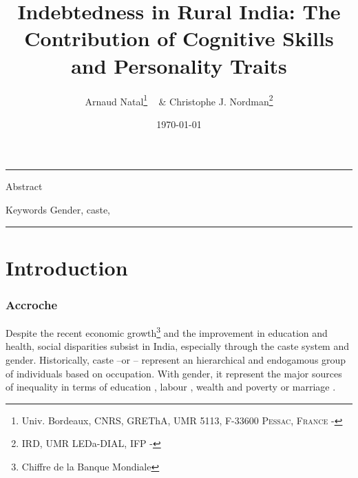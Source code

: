 \documentclass[a4paper, 11pt, onecolumn]{article}
\title{Indebtedness in Rural India: The Contribution of Cognitive Skills and Personality Traits}
\author{Arnaud Natal\thanks{Univ. Bordeaux, CNRS, GREThA, UMR 5113, F-33600 \textsc{Pessac, France} - \email{arnaud.natal@u-bordeaux.fr}} ~ \& Christophe J. Nordman\thanks{IRD, UMR LEDa-DIAL, IFP - \email{nordman@dial.prd}} }
\date{\today}
\begin{document}
\maketitle

\hrule 
\vspace{0.3cm}

\begin{resab}{Abstract}

\end{resab}

\begin{motkey}{Keywords}
Gender, caste, 
\end{motkey}


\hrule

\section{Introduction}
\label{Introduction}
		\subsubsection{Accroche}
Despite the recent economic growth\footnote{Chiffre de la Banque Mondiale} and the improvement in education and health, social disparities subsist in India, especially through the caste system and gender.
Historically, caste --or \jati -- represent an hierarchical and endogamous group of individuals based on occupation.
With gender, it represent the major sources of inequality in terms of education \citep{Munshi2006, Hasan2006, Saha2013}, labour \citep{Madheswaran2007, Mohanty2006, Das2012}, wealth and poverty \citep{Borooah2005b, Zacharias2011, Deshpande2000, EsteveVolart2004} or marriage \citep{Banerjee2009, Chacko2003}.

\end{document}
